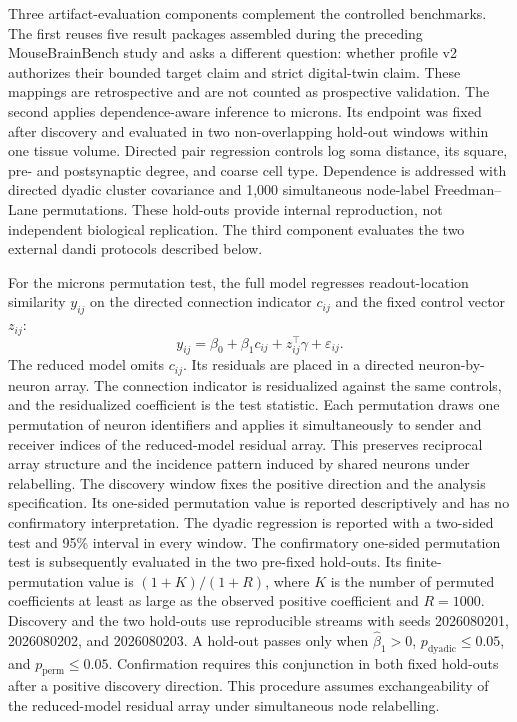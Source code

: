 Three artifact-evaluation components complement the controlled benchmarks. The first reuses five result packages assembled during the preceding MouseBrainBench study \citep{fernandezisabel2026mousebrainbench} and asks a different question: whether profile v2 authorizes their bounded target claim and strict digital-twin claim. These mappings are retrospective and are not counted as prospective validation. The second applies dependence-aware inference to \ac{microns}. Its endpoint was fixed after discovery and evaluated in two non-overlapping hold-out windows within one tissue volume. Directed pair regression controls log soma distance, its square, pre- and postsynaptic degree, and coarse cell type. Dependence is addressed with directed dyadic cluster covariance and 1,000 simultaneous node-label Freedman--Lane permutations. These hold-outs provide internal reproduction, not independent biological replication. The third component evaluates the two external \ac{dandi} protocols described below.

For the \ac{microns} permutation test, the full model regresses readout-location similarity $y_{ij}$ on the directed connection indicator $c_{ij}$ and the fixed control vector $z_{ij}$:
\begin{equation}
y_{ij}=\beta_0+\beta_1c_{ij}+z_{ij}^{\top}\gamma+\varepsilon_{ij}.
\label{eq:microns-full-model}
\end{equation}
The reduced model omits $c_{ij}$. Its residuals are placed in a directed neuron-by-neuron array. The connection indicator is residualized against the same controls, and the residualized coefficient is the test statistic. Each permutation draws one permutation of neuron identifiers and applies it simultaneously to sender and receiver indices of the reduced-model residual array. This preserves reciprocal array structure and the incidence pattern induced by shared neurons under relabelling. The discovery window fixes the positive direction and the analysis specification. Its one-sided permutation value is reported descriptively and has no confirmatory interpretation. The dyadic regression is reported with a two-sided test and 95\% interval in every window. The confirmatory one-sided permutation test is subsequently evaluated in the two pre-fixed hold-outs. Its finite-permutation value is $(1+K)/(1+R)$, where $K$ is the number of permuted coefficients at least as large as the observed positive coefficient and $R=1000$. Discovery and the two hold-outs use reproducible streams with seeds 2026080201, 2026080202, and 2026080203. A hold-out passes only when $\widehat{\beta}_1>0$, $p_{\mathrm{dyadic}}\leq0.05$, and $p_{\mathrm{perm}}\leq0.05$. Confirmation requires this conjunction in both fixed hold-outs after a positive discovery direction. This procedure assumes exchangeability of the reduced-model residual array under simultaneous node relabelling.

